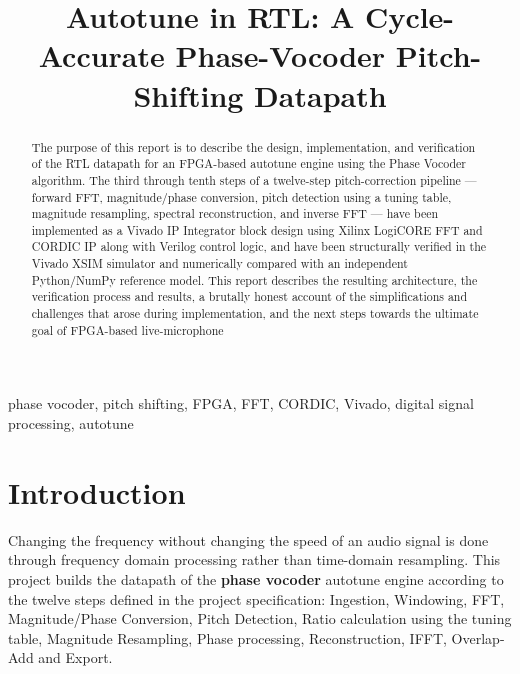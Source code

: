 \documentclass[conference,a4paper]{IEEEtran}
\begin{document}
\title{Autotune in RTL: A Cycle-Accurate Phase-Vocoder Pitch-Shifting Datapath}

\author{
}

\maketitle

\begin{abstract}
The purpose of this report is to describe the design, implementation, and verification of the RTL datapath for
an FPGA-based autotune engine using the Phase Vocoder algorithm. The third through tenth steps of a
twelve-step pitch-correction pipeline --- forward FFT, magnitude/phase conversion, pitch detection using a
tuning table, magnitude resampling, spectral reconstruction, and inverse FFT --- have been implemented as a
Vivado IP Integrator block design using Xilinx LogiCORE FFT and CORDIC IP along with Verilog control
logic, and have been structurally verified in the Vivado XSIM simulator and numerically compared with an
independent Python/NumPy reference model. This report describes the resulting architecture, the
verification process and results, a brutally honest account of the simplifications and challenges that arose
during implementation, and the next steps towards the ultimate goal of FPGA-based live-microphone
\end{abstract}

\begin{IEEEkeywords}
phase vocoder, pitch shifting, FPGA, FFT, CORDIC, Vivado, digital signal processing, autotune
\end{IEEEkeywords}

\section{Introduction}
Changing the frequency without changing the speed of an audio signal is done through frequency domain processing rather than time-domain resampling. This project builds the datapath of the \textbf{phase vocoder} autotune engine according to the twelve steps defined in the project specification: Ingestion, Windowing, FFT, Magnitude/Phase Conversion, Pitch Detection, Ratio calculation using the tuning table, Magnitude Resampling, Phase processing, Reconstruction, IFFT, Overlap-Add and Export.
\end{document}
